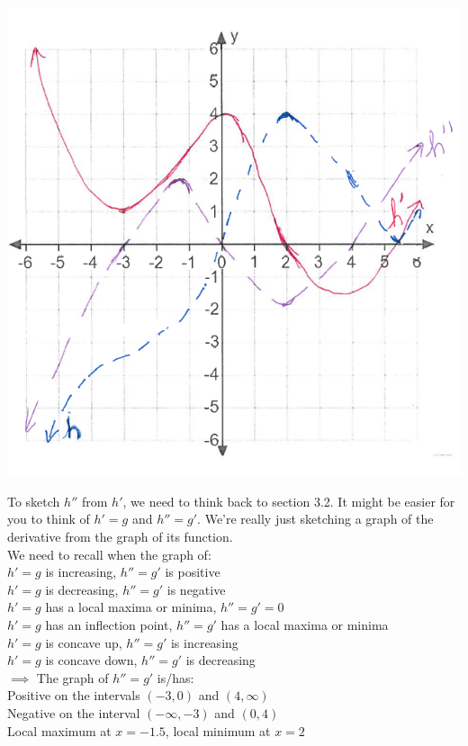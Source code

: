 \documentclass[nooutcomes,handout]{ximera}
\begin{document}
\begin{problem}
\begin{freeResponse}
      \begin{image}
        \includegraphics[scale = 0.5]{figure7.png}
      \end{image}	
				
				
To sketch $h''$ from $h'$, we need to think back to section 3.2.  It might be easier for you to think of $h'=g$ and $h''=g'$.  We're really just sketching a graph of the derivative from the graph of its function.  \\

We need to recall when the graph of:\\
$h'=g$ is increasing, $h''=g'$ is positive\\
$h'=g$ is decreasing, $h''=g'$ is negative\\
$h'=g$ has a local maxima or minima, $h''=g'=0$\\
$h'=g$ has an inflection point, $h''=g'$ has a local maxima or minima\\
$h'=g$ is concave up, $h''=g'$ is increasing\\
$h'=g$ is concave down, $h''=g'$ is decreasing\\

$\implies$
The graph of $h''=g'$ is/has:\\
Positive on the intervals $(-3,0)$ and $(4,\infty)$\\
Negative on the interval $(-\infty,-3)$ and $(0,4)$\\
Local maximum at $x=-1.5$, local minimum at $x=2$\\



\end{freeResponse}
\end{problem}
\end{document}
